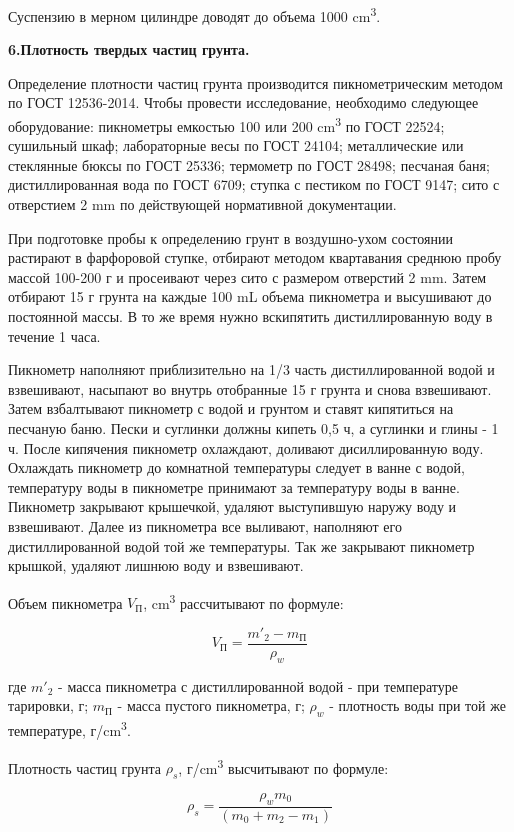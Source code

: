 Суспензию в мерном цилиндре доводят до объема 1000 \si{\centi\meter^3}.


\textbf{6.Плотность твердых частиц грунта.}

Определение плотности частиц грунта производится пикнометрическим методом по 
ГОСТ 12536-2014. Чтобы провести исследование, необходимо следующее оборудование:
пикнометры емкостью 100 или 200 \si{\centi\meter^3} по ГОСТ 22524; сушильный 
шкаф; лабораторные весы по ГОСТ 24104; металлические или стеклянные бюксы по 
ГОСТ 25336; термометр по ГОСТ 28498; песчаная баня; дистиллированная вода 
по ГОСТ 6709; ступка с пестиком по ГОСТ 9147; сито с отверстием 2 \si{\milli\meter} 
по действующей нормативной документации.

При подготовке пробы к определению грунт в воздушно-ухом состоянии растирают в фарфоровой 
ступке, отбирают методом квартавания среднюю пробу массой 100-200 г и просеивают через 
сито с размером отверстий 2 \si{\milli\meter}. Затем отбирают 15 г грунта на каждые 
100 \si{\milli\liter} объема пикнометра и высушивают до постоянной массы. В то же время нужно 
вскипятить дистиллированную воду в течение 1 часа.

Пикнометр наполняют приблизительно на 1/3 часть дистиллированной водой и взвешивают, 
насыпают во внутрь отобранные 15 г грунта и снова взвешивают. Затем взбалтывают пикнометр 
с водой и грунтом и ставят кипятиться на песчаную баню. Пески и суглинки должны кипеть 0,5 ч, 
а суглинки и глины - 1 ч. После кипячения пикнометр охлаждают, доливают дисиллированную воду.
Охлаждать пикнометр до комнатной температуры следует в ванне с водой, температуру воды в 
пикнометре принимают за температуру воды в ванне. Пикнометр закрывают крышечкой, удаляют 
выступившую наружу воду и взвешивают. Далее из пикнометра все выливают, наполняют его 
дистиллированной водой той же температуры. Так же закрывают пикнометр крышкой, удаляют 
лишнюю воду и взвешивают. 

Объем пикнометра \textit{$V_\text{П}$}, \si{\centi\meter^3} рассчитывают по формуле:

\[
   V_\text{П} = \frac{m'_2 - m_\text{П}}{\rho_w}
\]

где $m'_2$ - масса пикнометра с дистиллированной водой - при температуре тарировки, г;
$m_\text{П}$ - масса пустого пикнометра, г;
$\rho_w$ - плотность воды при той же температуре, г/\si{\centi\meter^3}.

Плотность частиц грунта $\rho_s$, г/\si{\centi\meter^3} высчитывают по формуле:

\[
   \rho_s = \frac{\rho_w m_0}{(m_0+m_2-m_1)}
\]

